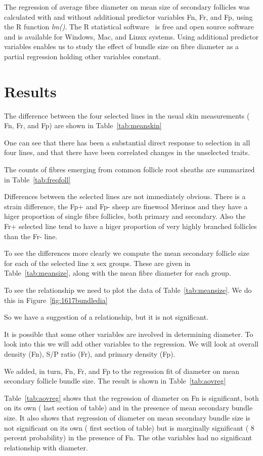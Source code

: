 \documentclass[titlepage]{article}  %
\begin{document}
The regression of average fibre diameter on mean size of secondary follicles was calculated with and without additional predictor variables Fn, Fr, and Fp, using the R function {\em lm()}. The R statistical software~\cite{rprog:13} is free and open source software and is available for Windows, Mac, and Linux systems. Using additional predictor variables enables us to study the effect of bundle size on fibre diameter  as a partial regression holding other variables constant. 

\section{Results}
The difference between the four selected lines in the usual skin measurements ( Fn, Fr, and Fp) are shown in Table~\ref{tab:meanskin}

One can see that there has been a substantial direct response to selection in all four lines, and that there have been correlated changes in the unselected traits.

The counts of fibres emerging from common follicle root sheaths are summarized in Table~\ref{tab:freqfoll}

Differences between the selected lines are not immediately obvious. There is a strain difference, the Fp+ and Fp- sheep are finewool Merinos and they have a higer proportion of single fibre follicles, both primary and secondary. Also the Fr+ selected line tend to have a higer proportion of very highly branched follicles than the Fr- line. 

To see the differences more clearly we compute the mean secondary follicle size for each of the selected line x sex groups. These are given in Table~\ref{tab:meansize}, along with the mean fibre diameter for each group.

To see the relationship we need to plot the data of Table~\ref{tab:meansize}. We do this in Figure~\ref{fig:1617bundledia}

So we have a suggestion of a relationship, but it is not significant. 

It is possible that some other variables are involved in determining diameter. To look into this we will add other variables to the regression. We will look at overall density (Fn), S/P ratio (Fr), and primary density (Fp).

We added, in turn, Fn, Fr, and Fp to the regression fit of diameter on mean secondary follicle bundle size.  The result is shown in Table~\ref{tab:aovreg}

Table~\ref{tab:aovreg} shows that the regression of diameter on Fn is significant, both on its own ( last section of table) and in the presence of mean secondary bundle size.  It also shows that regression of diameter on mean secondary bundle size is not significant on its own ( first section of table) but is marginally significant ( 8 percent probability) in the presence of Fn. The othe variables had no significant relationship with diameter.
\end{document}
